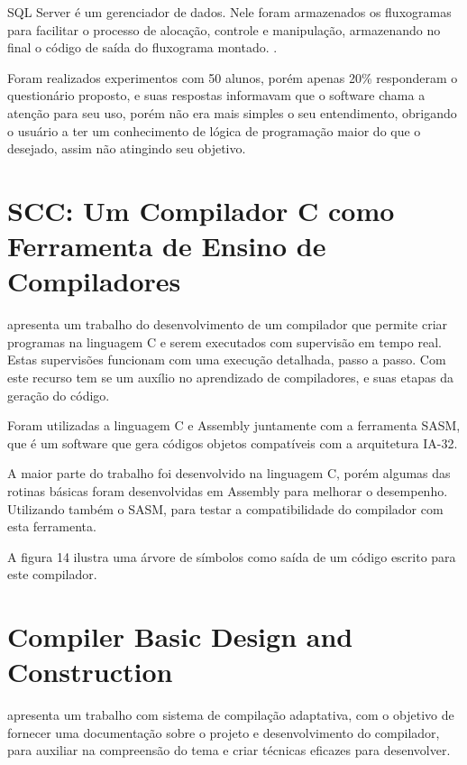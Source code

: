 \documentclass[12pt,oneside,a4paper,chapter=TITLE,section=TITLE,sumario=tradicional]{abntex2}
\begin{document}
SQL Server é um gerenciador de dados. Nele foram armazenados os fluxogramas para facilitar o processo de alocação, controle e manipulação, armazenando no final o código de saída do fluxograma montado. \cite{juliana2015}.

Foram realizados experimentos com 50 alunos, porém apenas 20\% responderam o questionário proposto, e suas respostas informavam que o software chama a atenção para seu uso, porém não era mais simples o seu entendimento, obrigando o usuário a ter um conhecimento de lógica de programação maior do que o desejado, assim não atingindo seu objetivo. 

\section{SCC: Um Compilador C como Ferramenta de Ensino de Compiladores}
\label{sec:scc}
 
\cite{juliano2009} apresenta um trabalho do desenvolvimento de um compilador que permite criar programas na linguagem C e serem executados com supervisão em tempo real. Estas supervisões funcionam com uma execução detalhada, passo a passo. Com este recurso tem se um auxílio no aprendizado de compiladores, e suas etapas da geração do código.

Foram utilizadas a linguagem C e Assembly juntamente com a ferramenta SASM, que é um software que gera códigos objetos compatíveis com a arquitetura IA-32.

A maior parte do trabalho foi desenvolvido na linguagem C, porém algumas das rotinas básicas foram desenvolvidas em Assembly para melhorar o desempenho. Utilizando também o SASM, para testar a compatibilidade do compilador com esta ferramenta.

A figura 14 ilustra uma árvore de símbolos como saída de um código escrito para este compilador. 

\begin{figure}[htb]
\end{figure}

\section{Compiler Basic Design and Construction}
\label{sec:compiler-basic}

\cite{mahak2009} apresenta um trabalho com sistema de compilação adaptativa, com o objetivo de fornecer uma documentação sobre o projeto e desenvolvimento do compilador, para auxiliar na compreensão do tema e criar técnicas eficazes para desenvolver.
\end{document}
